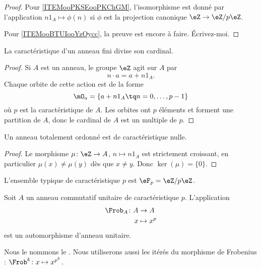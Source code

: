 \begin{proof}
    Pour \ref{ITEMooPKSEooPKChGM}, l'isomorphisme est donné par l'application \( n1_A\mapsto \phi(n)\) si \( \phi\) est la projection canonique \( \eZ\to \eZ/p\eZ\).

    Pour \ref{ITEMooBTUIooYzOycc}, la preuve est encore à faire. Écrivez-moi.
\end{proof}

\begin{proposition}     \label{PropGExaUK}
	La caractéristique d'un anneau fini divise son cardinal.
\end{proposition}

\begin{proof}
	Si \( A\) est un anneau, le groupe \( \eZ\) agit sur \( A\) par
	\begin{equation}
		n\cdot a=a+n1_A.
	\end{equation}
	Chaque orbite de cette action est de la forme
	\begin{equation}
		\mO_a=\{ a+n1_A\tq n=0,\ldots, p-1 \}
	\end{equation}
	où \( p\) est la caractéristique de \( A\). Les orbites ont \( p\) éléments et forment une partition de \( A\), donc le cardinal de \( A\) est un multiple de \( p\).
\end{proof}

\begin{lemma}        \label{LEMooJQIKooQgukqn}
	Un anneau totalement ordonné est de caractéristique nulle.
\end{lemma}

\begin{proof}
	Le morphisme \( \mu\colon \eZ\to A\), \( n\mapsto n 1_A\) est strictement croissant, en particulier \( \mu(x)\neq \mu(y)\) dès que \( x\neq y\). Donc \( \ker(\mu)=\{ 0 \}\).
\end{proof}

L'ensemble typique de caractéristique \( p\) est \( \eF_p=\eZ/p\eZ\).

\begin{proposition} \label{PropFrobHAMkTY}
	Soit \( A\) un anneau commutatif unitaire de caractéristique \( p\). L'application
	\begin{equation}
		\begin{aligned}
			\Frob_A\colon A & \to A       \\
			x               & \mapsto x^p
		\end{aligned}
	\end{equation}
	est un automorphisme d'anneau unitaire.
\end{proposition}
Nous le nommons le . Nous utiliserons aussi les itérés du morphisme de Frobenius : \( \Frob^k\colon x\mapsto x^{p^k}\).

